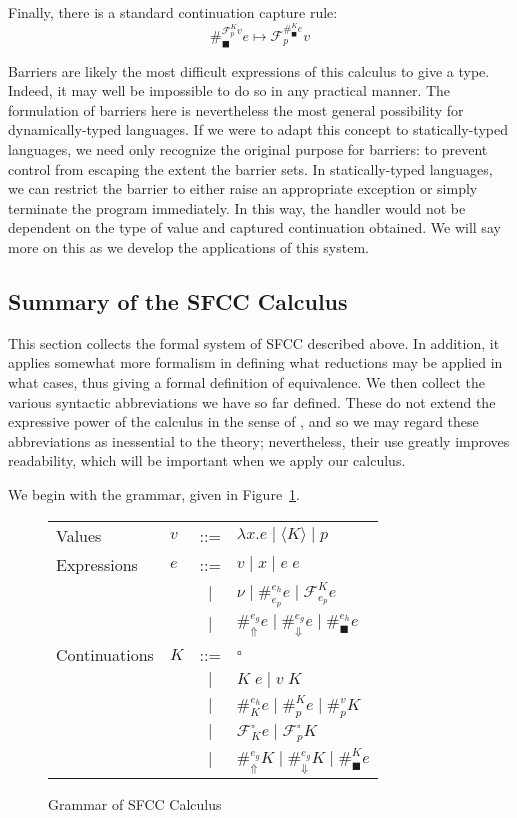 \documentclass[11pt]{article}
\newcommand{\maybePage}{\newpage}
\newcommand\F{\mathcal{F}}
\newcommand{\angles}[1]{\langle#1\rangle}
\begin{document}
Finally, there is a standard continuation capture rule:
$$\#_\blacksquare^{\F_p^K v}e \mapsto \F_p^{\#_\blacksquare^K e}v$$

Barriers are likely the most difficult expressions of this calculus to give a type.
Indeed, it may well be impossible to do so in any practical manner.
The formulation of barriers here is nevertheless the most general possibility for dynamically-typed languages.
If we were to adapt this concept to statically-typed languages, we need only recognize the original purpose for barriers: to prevent control from escaping the extent the barrier sets.
In statically-typed languages, we can restrict the barrier to either raise an appropriate exception or simply terminate the program immediately.
In this way, the handler would not be dependent on the type of value and captured continuation obtained.
We will say more on this as we develop the applications of this system.

\maybePage
\subsection{Summary of the SFCC Calculus}
\label{subsec:summarySFCCcalculus}

This section collects the formal system of SFCC described above.
In addition, it applies somewhat more formalism in defining what reductions may be applied in what cases, thus giving a formal definition of equivalence.
We then collect the various syntactic abbreviations we have so far defined.
These do not extend the expressive power of the calculus in the sense of \cite{Felleisen90expressive}, and so we may regard these abbreviations as inessential to the theory;
nevertheless, their use greatly improves readability, which will be important when we apply our calculus.

We begin with the grammar, given in Figure~\ref{fig:SFCCgrammar}.

\begin{figure}[H]
\caption{Grammar of SFCC Calculus}
\label{fig:SFCCgrammar}

\begin{tabular}{llcl}
Values & $v$ & ::= & $\lambda x.e \mid \angles{K} \mid p$ \\
Expressions & $e$ & ::= &
          $v \mid
           x \mid
           e\;e$ \\
& & $|$ & $\nu \mid
           \#_{e_p}^{e_h}e \mid
           \F_{e_p}^Ke$ \\
& & $|$ & $\#_\Uparrow^{e_g}e \mid
           \#_\Downarrow^{e_g}e \mid
           \#_\blacksquare^{e_h}e$ \\
Continuations & $K$ & ::= &
          $\square$ \\
& & $|$ & $K\;e \mid v\;K$ \\
& & $|$ & $\#_{K}^{e_h}e \mid
           \#_{p}^{K}e \mid
           \#_{p}^{v}K$ \\
& & $|$ & $\F_{K}^{\square}e \mid
           \F_{p}^{\square}K$ \\
& & $|$ & $\#_{\Uparrow}^{e_g}K \mid
           \#_{\Downarrow}^{e_g}K \mid
           \#_{\blacksquare}^{K}e$ \\
\end{tabular}
\end{figure}
\end{document}
